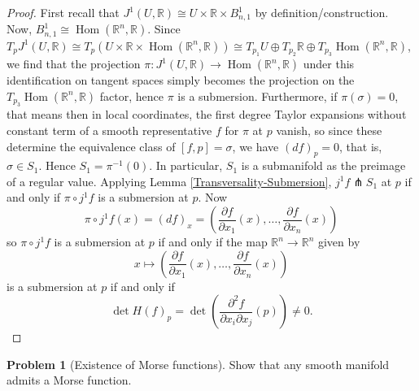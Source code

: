 \documentclass[reqno]{amsart}
\theoremstyle{definition}
\newtheorem{problem}[theorem]{Problem}
\theoremstyle{remark}
\DeclareMathOperator{\Hom}{Hom}
\begin{document}
 \begin{proof}
     First recall that
     $J^{1}(U,\mathbb{R}) \cong
     U \times \mathbb{R} \times B_{n,1}^{1}$ by
     definition/construction. Now,
     $B_{n,1}^{1} \cong
     \Hom \left( \mathbb{R}^{n},\mathbb{R} \right) $.
     Since
     $T_p J^{1}(U,\mathbb{R}) \cong
     T_{p} \left( U \times \mathbb{R} \times 
     \Hom \left( \mathbb{R}^{n},\mathbb{R} \right) \right) 
     \cong T_{p_1}U \oplus
     T_{p_2} \mathbb{R} \oplus
     T_{p_3} \Hom\left( \mathbb{R}^{n},\mathbb{R} \right) $,
     we find that the projection
     $\pi \colon J^{1}\left( U,\mathbb{R} \right) 
     \to \Hom \left( \mathbb{R}^{n},\mathbb{R} \right) $ 
     under this identification on tangent spaces
     simply becomes the projection on the
     $T_{p_3}\Hom \left( \mathbb{R}^{n},\mathbb{R} \right) $ 
     factor, hence $\pi$ is a submersion.
     Furthermore,
     if $\pi (\sigma) = 0$, that means then
     in local coordinates, the first degree
     Taylor expansions without constant term
     of a smooth representative  $f$ for $\pi$ at
     $p$ vanish, so since these determine
     the equivalence class of $\left[ f,p \right] = 
     \sigma$, we
     have  $(df)_p = 0$, that is, $\sigma
     \in S_1$.
     Hence $S_1 = \pi^{-1}(0)$. In particular,
     $S_1$ is a submanifold as the preimage of a
     regular value.
     Applying Lemma \ref{Transversality-Submersion},
     $j^{1}f \pitchfork S_1$ at $p$ if and only if
     $\pi \circ j^{1} f$ is a submersion at $p$.
     Now \[
     \pi \circ j^{1} f(x) = 
     \left( df \right)_x 
     =
     \left( \frac{\partial f}{\partial x_1}(x),
     \ldots, \frac{\partial f}{\partial x_n}(x)\right)
     \] 
     so $\pi \circ j^{1}f$ is a submersion at $p$ if
     and only if
     the map
     $\mathbb{R}^{n} \to \mathbb{R}^{n}$ 
     given by
     \[
     x\mapsto \left( \frac{\partial f}{\partial x_1}(x),
     \ldots, \frac{\partial f}{\partial x_n}(x)\right) 
     \] is a submersion at $p$ if and only if
     \[
     \det H (f)_p = \det \left( \frac{\partial^2 f}{
     \partial x_i \partial x_j} (p) \right) \neq 0.
     \] 
 \end{proof}


 \begin{problem}[Existence of Morse
     functions]\label{Problem:Existence-Morse-Functions}
     Show that any smooth manifold admits a Morse function.
 \end{problem}
\end{document}
